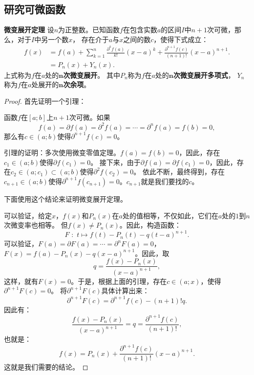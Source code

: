 \documentclass[12pt,UTF8]{ctexbook}
\begin{document}
\begin{appendix}
\section{研究可微函数}

\begin{tm}{\textbf{微变展开定理}}
    设$n$为正整数。已知函数$f$在包含实数$a$的区间$I$中$n+1$次可微，那么，对于$I$中另一个数$x$，
    存在介于$a$与$x$之间的数$c$，使得下式成立：
    \begin{align*}
        f(x) &= f(a) + \sum_{k=1}^n \frac{\partial^k f (a)}{k!}(x - a)^k + \frac{\partial^{n+1} f (c)}{(n+1)!}(x - a)^{n+1}.  \\
        &= P_n(x) + Y_n(x). 
    \end{align*}
    上式称为$f$在$a$处的$\boldsymbol{n}$\textbf{次微变展开}。
    其中$P_n$称为$f$在$a$处的$\boldsymbol{n}$\textbf{次微变展开多项式}，
    $Y_n$称为$f$在$a$处展开的$\boldsymbol{n}$\textbf{次余项}。
    
\end{tm}

\begin{proof}
    首先证明一个引理：

    函数$f$在$[a; b]$上$n+1$次可微。如果
    $$f(a) = \partial f(a) = \partial^2 f(a) = \cdots = \partial^{n} f(a) = f(b) = 0,$$
    那么有$c\in(a; b)$使得$\partial^{n+1} f(c) = 0$。

    引理的证明：多次使用微变零值定理。$f(a) = f(b) = 0$，因此，存在$c_1\in(a; b)$使得$\partial f (c_1) = 0$。
    接下来，由于$\partial f(a) = \partial f(c_1) = 0$，因此，存在$c_2\in(a; c_1)\subset(a; b)$使得$\partial^2 f (c_2) = 0$。
    依此不断，最终得到，存在$c_{n+1}\in(a; b)$使得$\partial^{n+1} f (c_{n+1}) = 0$。$c_{n+1}$就是我们要找的$c$。

    下面使用这个结论来证明微变展开定理。

    可以验证，给定$x$，$f(x)$和$P_n(x)$在$a$处的值相等，不仅如此，它们在$a$处的$1$到$n$次微变率也相等。
    但$f(x) \neq P_n(x)$。因此，构造函数：
    $$ F\,\,: \,\, t \mapsto f(t) - P_n(t) - q(t - a)^{n+1}. $$
    可以验证，$F(a) = \partial F(a) = \cdots = \partial^n F(a) = 0$，
    $F(x) = f(a) - P_n(x) - q(x - a)^{n+1}$。因此，取
    $$ q = \frac{f(x) - P_n(x)}{(x - a)^{n+1}}, $$
    这样，就有$F(x) = 0$。于是，根据上面的引理，存在$c\in(a; x)$，使得$\partial^{n+1} F(c) = 0$。
    将$\partial^{n+1} F(c)$具体计算出来：
    $$ \partial^{n+1} F(c) = \partial^{n+1} f(c) - (n+1)! q.$$
    因此有：
    $$ \frac{f(x) - P_n(x)}{(x - a)^{n+1}} = q = \frac{\partial^{n+1} f(c)}{(n+1)!}, $$
    也就是：
    $$ f(x) = P_n(x) + \frac{\partial^{n+1} f(c)}{(n+1)!} (x - a)^{n+1}. $$
    这就是我们需要的结论。
\end{proof}


\end{appendix}
\end{document}
